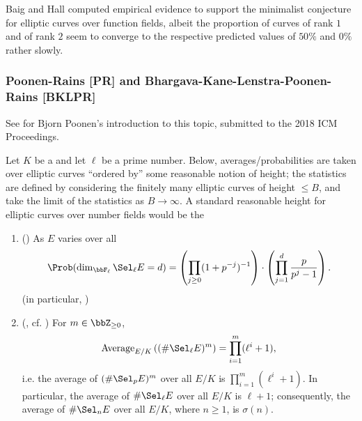 Baig and Hall \cite{baig_hall_edgscff} computed empirical evidence to support the minimalist conjecture for elliptic curves over function fields, albeit the proportion of curves of rank $1$ and of rank $2$ seem to converge to the respective predicted values of $50\%$ and $0\%$ rather slowly.

\subsubsection{Poonen-Rains [PR] and Bhargava-Kane-Lenstra-Poonen-Rains [BKLPR]}

See \cite{poonen_haec} for Bjorn Poonen's introduction to this topic, submitted to the 2018 ICM Proceedings. 


\begin{conjecture}
    Let $K$ be a  and let $\ell$ be a prime number. Below, averages/probabilities are taken over elliptic curves ``ordered by'' some reasonable notion of height; the statistics are defined by considering the finitely many elliptic curves of height $\leq B$, and take the limit of the statistics as $B \to \infty$. A standard reasonable height for elliptic curves over number fields would be the 
    \begin{enumerate}
        \item (\cite[Conjecture 1.1(a)]{poonen_rains_rmissg}) As $E$ varies over all 
        $$\Prob(\dim_{\bbF_\ell} \Sel_\ell E = d) = \left( \prod_{j \geq 0} (1 + p^{-j})^{-1} \right) \cdot \left( \prod_{j=1}^d \frac{p}{p^{j}-1} \right).$$
        (in particular, )


        \item (\cite[Conjecture 1.1(b),(c)]{poonen_rains_rmissg}, cf. \cite[Conjecture 3.4]{poonen_haec}) For $m \in \bbZ_{\geq 0}$,
        $$\operatorname{Average}_{E/K}\left((\# \Sel_\ell E)^m \right) = \prod_{i=1}^m (\ell^i + 1), $$
        i.e. the average of $(\# \Sel_p E)^m$ over all $E/K$ is $\prod_{i=1}^m (\ell^i + 1)$. In particular, the average of $\# \Sel_\ell E$ over all $E/K$ is $\ell+1$; consequently, the average of $\# \Sel_n E$ over all $E/K$, where $n \geq 1$, is $\sigma(n)$.


    \end{enumerate}
\end{conjecture}


